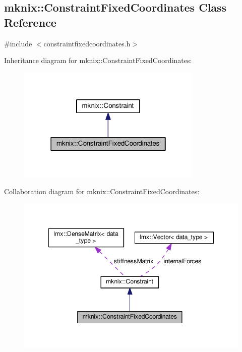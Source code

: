 \hypertarget{classmknix_1_1_constraint_fixed_coordinates}{}\subsection{mknix\+:\+:Constraint\+Fixed\+Coordinates Class Reference}
\label{classmknix_1_1_constraint_fixed_coordinates}


{\ttfamily \#include $<$constraintfixedcoordinates.\+h$>$}



Inheritance diagram for mknix\+:\+:Constraint\+Fixed\+Coordinates\+:\nopagebreak
\begin{figure}[H]
\begin{center}
\leavevmode
\includegraphics[width=250pt]{dd/da5/classmknix_1_1_constraint_fixed_coordinates__inherit__graph}
\end{center}
\end{figure}


Collaboration diagram for mknix\+:\+:Constraint\+Fixed\+Coordinates\+:\nopagebreak
\begin{figure}[H]
\begin{center}
\leavevmode
\includegraphics[width=348pt]{d5/d3d/classmknix_1_1_constraint_fixed_coordinates__coll__graph}
\end{center}
\end{figure}
